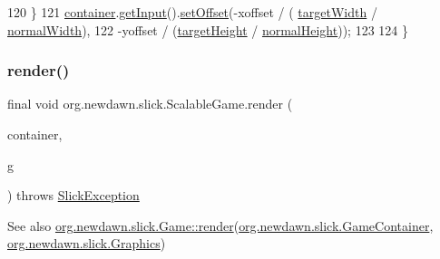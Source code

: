 \begin{DoxyCode}
120         \}
121         \mbox{\hyperlink{classorg_1_1newdawn_1_1slick_1_1_scalable_game_ae8df04372ae01e645445bc4a22f58c7c}{container}}.\mbox{\hyperlink{classorg_1_1newdawn_1_1slick_1_1_game_container_a6042fd06c54872f9f791bd33beffec88}{getInput}}().\mbox{\hyperlink{classorg_1_1newdawn_1_1slick_1_1_input_af618e44ab698b596f7b56e6bda4457eb}{setOffset}}(-xoffset / (
      \mbox{\hyperlink{classorg_1_1newdawn_1_1slick_1_1_scalable_game_a77bf0db185d31f78befc3b9ff9c69a9e}{targetWidth}} / \mbox{\hyperlink{classorg_1_1newdawn_1_1slick_1_1_scalable_game_a80c5555ac348d1b5224c9cf391baceae}{normalWidth}}), 
122                                        -yoffset / (\mbox{\hyperlink{classorg_1_1newdawn_1_1slick_1_1_scalable_game_a99f38c5f6f77f872c998a0278a394a50}{targetHeight}} / 
      \mbox{\hyperlink{classorg_1_1newdawn_1_1slick_1_1_scalable_game_a47e0975aeb3ea50e10207311e2e9371e}{normalHeight}}));
123         
124     \}
\end{DoxyCode}
\mbox{\label{classorg_1_1newdawn_1_1slick_1_1_scalable_game_a66110f8ce46498916ec06f345cad5b5c}} 
\subsubsection{\texorpdfstring{render()}{render()}}
{\footnotesize\ttfamily final void org.\+newdawn.\+slick.\+Scalable\+Game.\+render (\begin{DoxyParamCaption}\item[{\mbox{\hyperlink{classorg_1_1newdawn_1_1slick_1_1_game_container}{Game\+Container}}}]{container,  }\item[{\mbox{\hyperlink{classorg_1_1newdawn_1_1slick_1_1_graphics}{Graphics}}}]{g }\end{DoxyParamCaption}) throws \mbox{\hyperlink{classorg_1_1newdawn_1_1slick_1_1_slick_exception}{Slick\+Exception}}\hspace{0.3cm}{\ttfamily [inline]}}

\begin{DoxySeeAlso}{See also}
\mbox{\hyperlink{interfaceorg_1_1newdawn_1_1slick_1_1_game_af1a4670d43eb3ba04dfcf55ab1975b64}{org.\+newdawn.\+slick.\+Game\+::render}}(\mbox{\hyperlink{classorg_1_1newdawn_1_1slick_1_1_game_container}{org.\+newdawn.\+slick.\+Game\+Container}}, \mbox{\hyperlink{classorg_1_1newdawn_1_1slick_1_1_graphics}{org.\+newdawn.\+slick.\+Graphics}}) 
\end{DoxySeeAlso}


